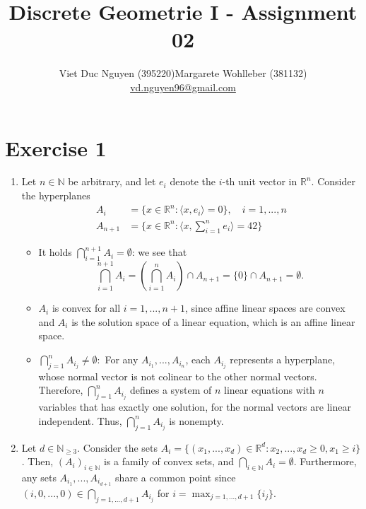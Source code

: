 \documentclass{article}
\title{Discrete Geometrie I - Assignment 02}
\date{}
\author{Viet Duc Nguyen (395220)\qquad Margarete Wohlleber (381132)\\
    \underline{vd.nguyen96@gmail.com}
}
\begin{document}
\maketitle

\section*{Exercise 1}
\begin{enumerate}[label=(\alph*)]
    \item Let $n \in \mathbb N$ be arbitrary, and let $e_i$ denote the $i$-th unit vector in $\mathbb R^n$. Consider the hyperplanes 
    \begin{align*}
        A_i &= \{ x \in \mathbb R^n : \langle x,e_i \rangle = 0 \}, \quad i = 1,...,n \\
        A_{n+1} &= \{ x \in \mathbb R^n: \langle x,\sum_{i=1}^ne_i \rangle = 42 \}
    \end{align*}
    \begin{itemize}
        \item It holds $\bigcap_{i=1}^{n+1} A_i = \emptyset$: we see that $$\bigcap_{i=1}^{n+1} A_i = \left(\bigcap^n_{i=1} A_i\right) \cap A_{n+1} = \{0\} \cap A_{n+1} = \emptyset.$$

        \item $A_i$ is convex for all $i=1,...,n+1$, since affine linear spaces are convex and $A_i$ is the solution space of a linear equation, which is an affine linear space.
        
        \item $\bigcap_{j=1}^n A_{i_j} \neq \emptyset:$ For any $A_{i_1},...,A_{i_n}$, each $A_{i_j}$ represents a hyperplane, whose normal vector is not colinear to the other normal vectors. Therefore, $\bigcap_{j=1}^n A_{i_j}$ defines a system of $n$ linear equations with $n$ variables that has exactly one solution, for the normal vectors are linear independent. Thus, $\bigcap_{j=1}^n A_{i_j}$ is nonempty.
    \end{itemize}
    
    

    \item Let $d \in \mathbb N_{\geq 3}$. Consider the sets $A_i = \{ (x_1,...,x_d) \in \mathbb R^d : x_2,...,x_{d} \geq 0, x_1 \geq i \}$. Then, $(A_i)_{i \in \mathbb N}$ is a family of convex sets, and $\bigcap_{i \in \mathbb N} A_i = \emptyset$. Furthermore, any sets $A_{i_1},...,A_{i_{d+1}}$ share a common point since $(i,0,...,0) \in \bigcap_{j=1,...,d+1} A_{i_j}$ for $i = \max_{j=1,...,d+1}\{i_j \}$.
\end{enumerate}
\end{document}
